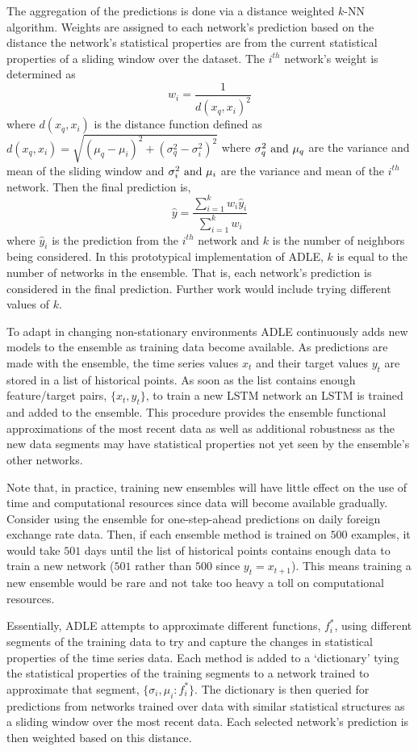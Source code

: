 \documentclass{article}
\begin{document}
The aggregation of the predictions is done via a distance weighted $k$-NN algorithm. Weights are assigned to each network's prediction based on the distance the network's statistical properties are from the current statistical properties of a sliding window over the dataset. The $i^{th}$ network's weight is determined as
$$
	w_i = \frac{1}{d(x_q, x_i)^2}
$$
where $d(x_q, x_i)$ is the distance function defined as $d(x_q, x_i) = \sqrt{(\mu_q - \mu_i)^2 + (\sigma^2_q - \sigma^2_i)^2}$ where $\sigma^2_q \textnormal{ and } \mu_q$ are the variance and mean of the sliding window and $\sigma^2_i \textnormal{ and } \mu_i$ are the variance and mean of the $i^{th}$ network. Then the final prediction is, 
$$
	\hat{y} = \frac{\sum_{i=1}^k w_i\hat{y}_i}{\sum_{i=1}^k w_i}
$$
where $\hat{y}_i$ is the prediction from the $i^{th}$ network and $k$ is the number of neighbors being considered. In this prototypical implementation of ADLE, $k$ is equal to the number of networks in the ensemble. That is, each network's prediction is considered in the final prediction. Further work would include trying different values of $k$.

To adapt in changing non-stationary environments ADLE continuously adds new models to the ensemble as training data become available. As predictions are made with the ensemble, the time series values $x_t$ and their target values $y_t$ are stored in a list of historical points. As soon as the list contains enough feature/target pairs, $\{x_t, y_t\}$, to train a new LSTM network  an LSTM is trained and added to the ensemble. This procedure provides the ensemble functional approximations of the most recent data as well as additional robustness as the new data segments may have statistical properties not yet seen by the ensemble's other networks. 

Note that, in practice, training new ensembles will have little effect on the use of time and computational resources since data will become available gradually. Consider using the ensemble for one-step-ahead predictions on daily foreign exchange rate data. Then, if each ensemble method is trained on $500$ examples, it would take $501$ days until the list of historical points contains enough data to train a new network ($501$ rather than $500$ since $y_t = x_{t+1}$). This means training a new ensemble would be rare and not take too heavy a toll on computational resources.

Essentially, ADLE attempts to approximate different functions, $f^*_i$, using different segments of the training data to try and capture the changes in statistical properties of the time series data. Each method is added to a `dictionary' tying the statistical properties of the training segments to a network trained to approximate that segment, $\{\sigma_i, \mu_i : f^*_i\}$. The dictionary is then queried for predictions from networks trained over data with similar statistical structures as a sliding window over the most recent data. Each selected network's prediction is then weighted based on this distance.
\end{document}
